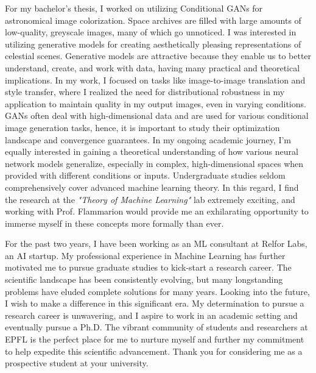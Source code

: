 \documentclass{article}
\begin{document}
\hspace{0.25in}For my bachelor's thesis, I worked on utilizing Conditional GANs
for astronomical image colorization. Space archives are filled with large
amounts of low-quality, greyscale images, many of which go unnoticed. I was
interested in utilizing generative models for creating aesthetically pleasing
representations of celestial scenes. Generative models are attractive because
they enable us to better understand, create, and work with data, having many
practical and theoretical implications. In my work, I focused on tasks like
image-to-image translation and style transfer, where I realized the need for
distributional robustness in my application to maintain quality in my output
images, even in varying conditions. GANs often deal with high-dimensional data
and are used for various conditional image generation tasks, hence, it is
important to study their optimization landscape and convergence guarantees. In
my ongoing academic journey, I'm equally interested in gaining a theoretical
understanding of how various neural network models generalize, especially in
complex, high-dimensional spaces when provided with different conditions or
inputs. Undergraduate studies seldom comprehensively cover advanced machine
learning theory. In this regard, I find the research at the \textit{"Theory of Machine
Learning"} lab extremely exciting, and working with Prof. Flammarion would
provide me an exhilarating opportunity to immerse myself in these concepts more
formally than ever.
\vspace{3pt}

\hspace{0.25in}For the past two years, I have been working as an ML consultant
at Relfor Labs, an AI startup. My professional experience in Machine Learning
has further motivated me to pursue graduate studies to kick-start a research
career. The scientific landscape has been consistently evolving, but many
longstanding problems have eluded complete solutions for many years. Looking
into the future, I wish to make a difference in this significant era. My
determination to pursue a research career is unwavering, and I aspire to work in
an academic setting and eventually pursue a Ph.D. The vibrant community of
students and researchers at EPFL is the perfect place for me to nurture myself
and further my commitment to help expedite this scientific advancement. Thank
you for considering me as a prospective student at your university.
 
\end{document}
